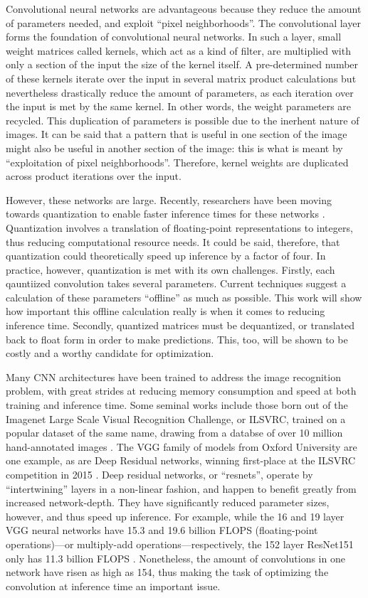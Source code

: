 Convolutional neural networks are advantageous because they reduce the amount of parameters needed, and exploit ``pixel neighborhoods''. The convolutional layer forms the foundation of convolutional neural networks. In such a layer, small weight matrices called kernels, which act as a kind of filter, are multiplied with only a section of the input the size of the kernel itself. A pre-determined number of these kernels iterate over the input in several matrix product calculations but nevertheless drastically reduce the amount of parameters, as each iteration over the input is met by the same kernel. In other words, the weight parameters are recycled. This duplication of parameters is possible due to the inerhent nature of images. It can be said that a pattern that is useful in one section of the image might also be useful in another section of the image: this is what is meant by ``exploitation of pixel neighborhoods''. Therefore, kernel weights are duplicated across product iterations over the input.

However, these networks are large. Recently, researchers have been moving towards quantization to enable faster inference times for these networks \cite{warden_quantize}. Quantization involves a translation of floating-point representations to integers, thus reducing computational resource needs. It could be said, therefore, that quantization could theoretically speed up inference by a factor of four. In practice, however, quantization is met with its own challenges. Firstly, each qauntiized convolution takes several parameters. Current techniques suggest a calculation of these parameters ``offline'' as much as possible. This work will show how important this offline calculation really is when it comes to reducing inference time. Secondly, quantized matrices must be dequantized, or translated back to float form in order to make predictions. This, too, will be shown to be costly and a worthy candidate for optimization.

Many CNN architectures have been trained to address the image recognition problem, with great strides at reducing memory consumption and speed at both training and inference time. Some seminal works include those born out of the Imagenet Large Scale Visual Recognition Challenge, or ILSVRC, trained on a popular dataset of the same name, drawing from a databse of over 10 million hand-annotated images \cite{imagenet}. The VGG family of models from Oxford University \cite{return} are one example, as are Deep Residual networks, winning first-place at the ILSVRC competition in 2015 \cite{resnets2}. Deep residual networks, or ``resnets'', operate by ``intertwining'' layers in a non-linear fashion, and happen to benefit greatly from increased network-depth. They have significantly reduced parameter sizes, however, and thus speed up inference. For example, while the 16 and 19 layer VGG neural networks have 15.3 and 19.6 billion FLOPS (floating-point operations)---or multiply-add operations---respectively, the 152 layer ResNet151 only has 11.3 billion FLOPS \cite{resnets2}. Nonetheless, the amount of convolutions in one network have risen as high as 154, thus making the task of optimizing the convolution at inference time an important issue. 

